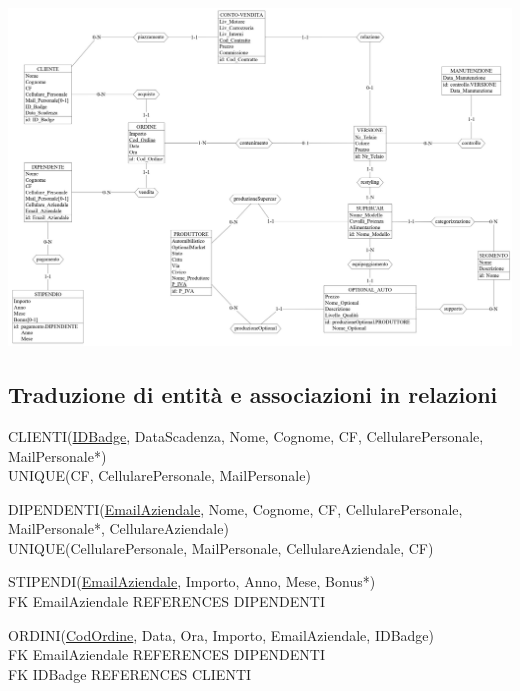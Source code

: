 \documentclass[11pt]{article}
\begin{document}
\begin{center}
    \includegraphics[scale=0.92, angle=90]{images/schemaLogico.jpeg}
\end{center}

\newpage

\subsection{Traduzione di entità e associazioni in relazioni}

\small

\begin{flushleft}
CLIENTI(\underline{IDBadge}, DataScadenza, Nome, Cognome, CF,
    CellularePersonale, MailPersonale*)\\
UNIQUE(CF, CellularePersonale, MailPersonale)
\end{flushleft}
    

\begin{flushleft}
DIPENDENTI(\underline{EmailAziendale}, Nome, Cognome, CF, CellularePersonale,
MailPersonale*, CellulareAziendale)\\
UNIQUE(CellularePersonale, MailPersonale, CellulareAziendale, CF)
\end{flushleft}

\begin{flushleft}
STIPENDI(\underline{EmailAziendale}, Importo, Anno, Mese, Bonus*)\\
FK EmailAziendale REFERENCES DIPENDENTI
\end{flushleft}

\begin{flushleft}
ORDINI(\underline{CodOrdine}, Data, Ora, Importo, EmailAziendale, IDBadge)\\
FK EmailAziendale REFERENCES DIPENDENTI\\
FK IDBadge REFERENCES CLIENTI
\end{flushleft}
\end{document}
